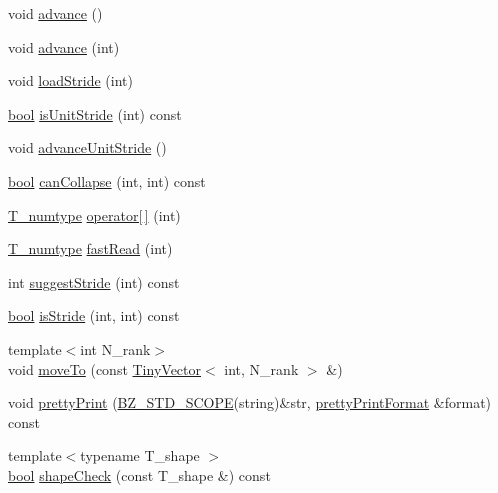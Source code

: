 \begin{DoxyCompactItemize}
void \hyperlink{class__bz__ArrayExprReduce_acb8996a0f1f2ac8f13751768bfaadfb8}{advance} ()
\item 
void \hyperlink{class__bz__ArrayExprReduce_a4446ecc38eb3c134f8cf32d4b538ff69}{advance} (int)
\item 
void \hyperlink{class__bz__ArrayExprReduce_a93c2336eeaba22e4de74dd3e8000d5e6}{load\+Stride} (int)
\item 
\hyperlink{compiler_8h_abb452686968e48b67397da5f97445f5b}{bool} \hyperlink{class__bz__ArrayExprReduce_a2d7bca056966550235d7bffc20756d89}{is\+Unit\+Stride} (int) const 
\item 
void \hyperlink{class__bz__ArrayExprReduce_a100152fddc0c7325acbba4c9bc10aba0}{advance\+Unit\+Stride} ()
\item 
\hyperlink{compiler_8h_abb452686968e48b67397da5f97445f5b}{bool} \hyperlink{class__bz__ArrayExprReduce_aab82232a33eea4b4b54e1352d9ce47df}{can\+Collapse} (int, int) const 
\item 
\hyperlink{class__bz__ArrayExprReduce_a3ddc92b95f8b98391d5e09769317f1dc}{T\+\_\+numtype} \hyperlink{class__bz__ArrayExprReduce_a1f4ab6bed7d31538976fa36399f4734b}{operator\mbox{[}$\,$\mbox{]}} (int)
\item 
\hyperlink{class__bz__ArrayExprReduce_a3ddc92b95f8b98391d5e09769317f1dc}{T\+\_\+numtype} \hyperlink{class__bz__ArrayExprReduce_a6b3db42d28a9b9beedc4af1ebc909202}{fast\+Read} (int)
\item 
int \hyperlink{class__bz__ArrayExprReduce_a13c3c1c148e867c71693a4b470149ed7}{suggest\+Stride} (int) const 
\item 
\hyperlink{compiler_8h_abb452686968e48b67397da5f97445f5b}{bool} \hyperlink{class__bz__ArrayExprReduce_a1efd93fff830acaeaf0f5ba357ef4ccc}{is\+Stride} (int, int) const 
\item 
{\footnotesize template$<$int N\+\_\+rank$>$ }\\void \hyperlink{class__bz__ArrayExprReduce_ae67a07b3b780b4bb3561f45f9b829758}{move\+To} (const \hyperlink{classTinyVector}{Tiny\+Vector}$<$ int, N\+\_\+rank $>$ \&)
\item 
void \hyperlink{class__bz__ArrayExprReduce_a6c1863ec419c085386e90e7100d25932}{pretty\+Print} (\hyperlink{numinquire_8h_a2b24ffc3b4ef9803956bc7715c6c7b83}{B\+Z\+\_\+\+S\+T\+D\+\_\+\+S\+C\+O\+P\+E}(string)\&str, \hyperlink{classprettyPrintFormat}{pretty\+Print\+Format} \&format) const 
\item 
{\footnotesize template$<$typename T\+\_\+shape $>$ }\\\hyperlink{compiler_8h_abb452686968e48b67397da5f97445f5b}{bool} \hyperlink{class__bz__ArrayExprReduce_a34d06bcaa61311f8be306c576fd6cab9}{shape\+Check} (const T\+\_\+shape \&) const 
\end{DoxyCompactItemize}
